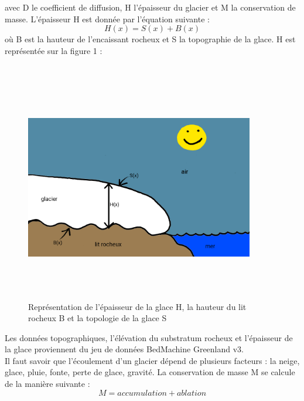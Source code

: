 \documentclass{article}
\begin{document}
avec D le coefficient de diffusion, H l'épaisseur du glacier et M la conservation de masse.
\newpage
L'épaisseur H est donnée par l'équation suivante :
\begin{equation}
H(x) = S(x) + B(x)
\label{eq4}
\end{equation}
où B est la hauteur de l'encaissant rocheux et S la topographie de la glace. H est représentée sur la figure 1 : 
\\
\\
\begin{figure}[!htpb]
\centering
\includegraphics[width=10cm, keepaspectratio=true, height=10cm]{H.png}
\caption{Représentation de l'épaisseur de la glace H, la hauteur du lit rocheux B et la topologie de la glace S}
\label{fig01ch1}
\end{figure}
\newline
Les données topographiques, l'élévation du substratum rocheux et l'épaisseur de la glace proviennent du jeu de données BedMachine Greenland v3. 
\\

Il faut savoir que l'écoulement d'un glacier dépend de plusieurs facteurs : la neige, glace, pluie, fonte, perte de glace, gravité. La conservation de masse M se calcule de la manière suivante :
\begin{equation}
M = accumulation + ablation
\label{5}
\end{equation}
\end{document}
